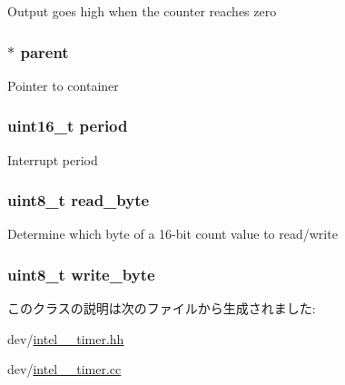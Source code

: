 \label{classIntel8254Timer_1_1Counter_a6c9d5e12c24d1d47d350b441b6d5c139}
Output goes high when the counter reaches zero \hypertarget{classIntel8254Timer_1_1Counter_a86e82cfefcf778560bdfcdfffadac005}{
\subsubsection[{parent}]{$\ast$ {\bf parent}}}
\label{classIntel8254Timer_1_1Counter_a86e82cfefcf778560bdfcdfffadac005}
Pointer to container \hypertarget{classIntel8254Timer_1_1Counter_a258408d6d5d13a24bfa5211d81ce1682}{
\subsubsection[{period}]{\setlength{\rightskip}{0pt plus 5cm}uint16\_\-t {\bf period}}}
\label{classIntel8254Timer_1_1Counter_a258408d6d5d13a24bfa5211d81ce1682}
Interrupt period \hypertarget{classIntel8254Timer_1_1Counter_a81105dfaa6881506c9e7e553ed1965c7}{
\subsubsection[{read\_\-byte}]{\setlength{\rightskip}{0pt plus 5cm}uint8\_\-t {\bf read\_\-byte}}}
\label{classIntel8254Timer_1_1Counter_a81105dfaa6881506c9e7e553ed1965c7}
Determine which byte of a 16-\/bit count value to read/write \hypertarget{classIntel8254Timer_1_1Counter_afd325bae49ff6d9215ad195a5267895a}{
\subsubsection[{write\_\-byte}]{\setlength{\rightskip}{0pt plus 5cm}uint8\_\-t {\bf write\_\-byte}}}
\label{classIntel8254Timer_1_1Counter_afd325bae49ff6d9215ad195a5267895a}


このクラスの説明は次のファイルから生成されました:\begin{DoxyCompactItemize}
\item 
dev/\hyperlink{intel__8254__timer_8hh}{intel\_\_\-timer.hh}\item 
dev/\hyperlink{intel__8254__timer_8cc}{intel\_\_\-timer.cc}\end{DoxyCompactItemize}
